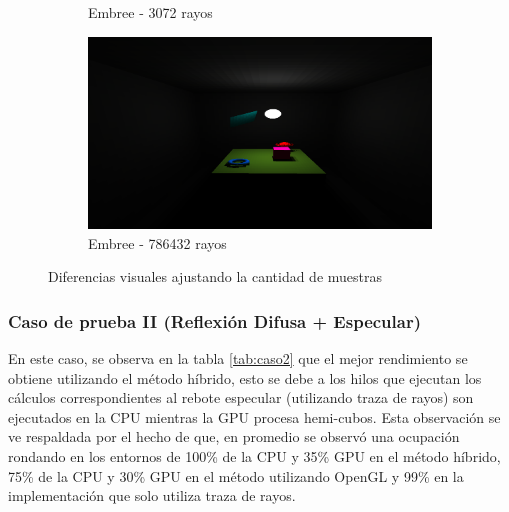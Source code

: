 \begin{figure}[htbp]
\begin{subfigure}{0.45\textwidth}
		\caption{Embree - 3072 rayos}
	\end{subfigure}
	\begin{subfigure}{0.45\textwidth}
		\includegraphics[width=1\linewidth]{assets/512srt}
		\caption{Embree - 786432 rayos}
	\end{subfigure}
	\caption{Diferencias visuales ajustando la cantidad de muestras}
	\label{img:difres}
\end{figure}

\subsubsection{Caso de prueba II (Reflexión Difusa + Especular)}

En este caso, se observa en la tabla \ref{tab:caso2} que el mejor rendimiento se obtiene utilizando el método híbrido, esto se debe a los hilos que ejecutan los cálculos correspondientes al rebote especular (utilizando traza de rayos) son ejecutados en la CPU mientras la GPU procesa hemi-cubos. Esta observación se ve respaldada por el hecho de que, en promedio se observó una ocupación rondando en los entornos de 100\% de la CPU y 35\% GPU en el método híbrido, 75\% de la CPU y 30\% GPU en el método utilizando OpenGL y 99\% en la implementación que solo utiliza traza de rayos. 

